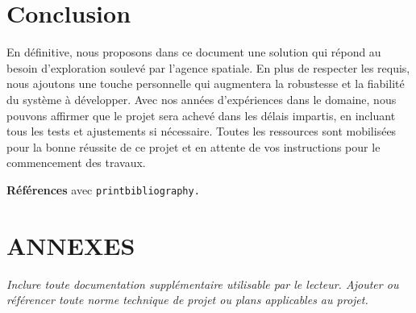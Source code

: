 \documentclass{mistcoursedoc}
\begin{document}
\section*{Conclusion}

En définitive, nous proposons dans ce document une solution qui répond au besoin d’exploration soulevé par l'agence spatiale. En plus de respecter les requis, nous ajoutons une touche personnelle qui augmentera la robustesse et la fiabilité du système à développer. Avec nos années d'expériences dans le domaine, nous pouvons affirmer que le projet sera achevé dans les délais impartis, en incluant tous les tests et ajustements si nécessaire. Toutes les ressources sont mobilisées pour la bonne réussite de ce projet et en attente de vos instructions pour le commencement des travaux.

\textbf{Références} avec \texttt{printbibliography.}


\section*{ANNEXES}

\textit{Inclure toute documentation supplémentaire utilisable par le lecteur. Ajouter ou référencer toute norme technique de projet ou plans applicables au projet.}
\end{document}

